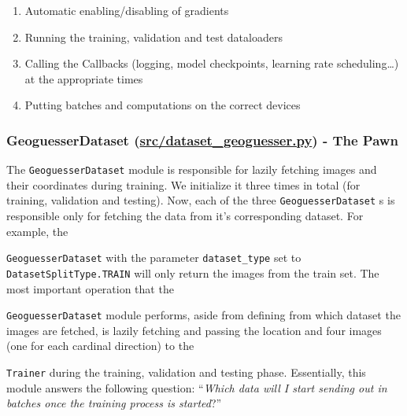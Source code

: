 \documentclass[]{article}
\providecommand{\tightlist}{%
  \setlength{\itemsep}{0pt}\setlength{\parskip}{0pt}}
\let\oldtexttt\texttt
\renewcommand{\texttt}[1]{
  \textcolor{tcolor}{\colorbox{bgcolor}{\oldtexttt{#1}}}
}
\begin{document}
\begin{enumerate}
  \begin{enumerate}
  \def\labelenumii{\arabic{enumii}.}
  \tightlist
  \item
    Automatic enabling/disabling of gradients
  \item
    Running the training, validation and test dataloaders
  \item
    Calling the Callbacks (logging, model checkpoints, learning rate
    scheduling\ldots{}) at the appropriate times
  \item
    Putting batches and computations on the correct devices
  \end{enumerate}
\end{enumerate}

\hypertarget{geoguesserdataset-srcdataset_geoguesser.py---the-pawn}{%
\subsubsection{\texorpdfstring{GeoguesserDataset
(\href{../src/dataset_geoguesser.py}{src/dataset\_geoguesser.py}) - The
Pawn}{GeoguesserDataset (src/dataset\_geoguesser.py) - The Pawn}}\label{geoguesserdataset-srcdataset_geoguesser.py---the-pawn}}

The \texttt{GeoguesserDataset} module is responsible for lazily fetching
images and their coordinates during training. We initialize it three
times in total (for training, validation and testing). Now, each of the
three \texttt{GeoguesserDataset}s is responsible only for fetching the
data from it's corresponding dataset. For example, the
\texttt{GeoguesserDataset} with the parameter \texttt{dataset\_type} set
to \texttt{DatasetSplitType.TRAIN} will only return the images from the
train set. The most important operation that the
\texttt{GeoguesserDataset} module performs, aside from defining from
which dataset the images are fetched, is lazily fetching and passing the
location and four images (one for each cardinal direction) to the
\texttt{Trainer} during the training, validation and testing phase.
Essentially, this module answers the following question: ``\emph{Which
data will I start sending out in batches once the training process is
started}?''
\end{document}
